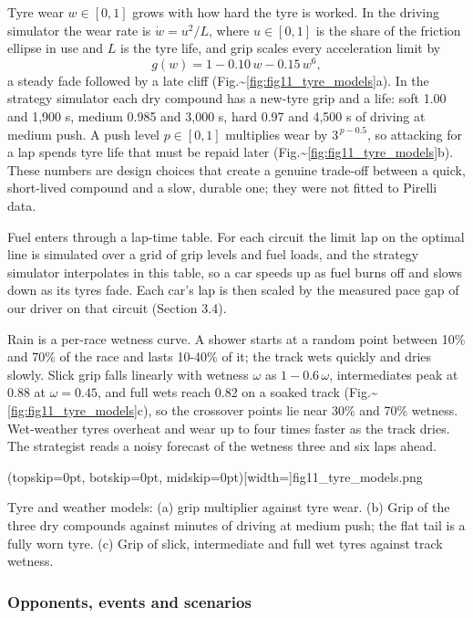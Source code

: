 \documentclass{ieeeaccess}
\begin{document}
Tyre wear \(w\in[0,1]\) grows with how hard the tyre is worked. In the driving
simulator the wear rate is \(\dot w=u^2/L\), where \(u\in[0,1]\) is the share of the
friction ellipse in use and \(L\) is the tyre life, and grip scales every acceleration
limit by
\[g(w)=1-0.10\,w-0.15\,w^{6},\]
a steady fade followed by a late cliff (Fig.\textasciitilde{}\ref{fig:fig11_tyre_models}a). In the strategy simulator each dry
compound has a new-tyre grip and a life: soft 1.00 and 1,900 s, medium 0.985 and
3,000 s, hard 0.97 and 4,500 s of driving at medium push. A push level \(p\in[0,1]\)
multiplies wear by \(3^{\,p-0.5}\), so attacking for a lap spends tyre life that must
be repaid later (Fig.\textasciitilde{}\ref{fig:fig11_tyre_models}b). These numbers are design choices that create a genuine
trade-off between a quick, short-lived compound and a slow, durable one; they were
not fitted to Pirelli data.

Fuel enters through a lap-time table. For each circuit the limit lap on the optimal
line is simulated over a grid of grip levels and fuel loads, and the strategy
simulator interpolates in this table, so a car speeds up as fuel burns off and slows
down as its tyres fade. Each car's lap is then scaled by the measured pace gap of
our driver on that circuit (Section 3.4).

Rain is a per-race wetness curve. A shower starts at a random point between 10\% and
70\% of the race and lasts 10-40\% of it; the track wets quickly and dries slowly.
Slick grip falls linearly with wetness \(\omega\) as \(1-0.6\,\omega\), intermediates
peak at 0.88 at \(\omega=0.45\), and full wets reach 0.82 on a soaked track
(Fig.\textasciitilde{}\ref{fig:fig11_tyre_models}c), so the crossover points lie near 30\% and 70\% wetness. Wet-weather tyres
overheat and wear up to four times faster as the track dries. The strategist reads
a noisy forecast of the wetness three and six laps ahead.

\Figure[t!](topskip=0pt, botskip=0pt, midskip=0pt)[width=\textwidth]{fig11_tyre_models.png}
{\parbox{0.92\textwidth}{Tyre and weather models: (a) grip multiplier against tyre wear. (b) Grip of the three dry compounds against minutes of driving at medium push; the flat tail is a fully worn tyre. (c) Grip of slick, intermediate and full wet tyres against track wetness.}\label{fig:fig11_tyre_models}}

\subsubsection{Opponents, events and scenarios}
\end{document}
